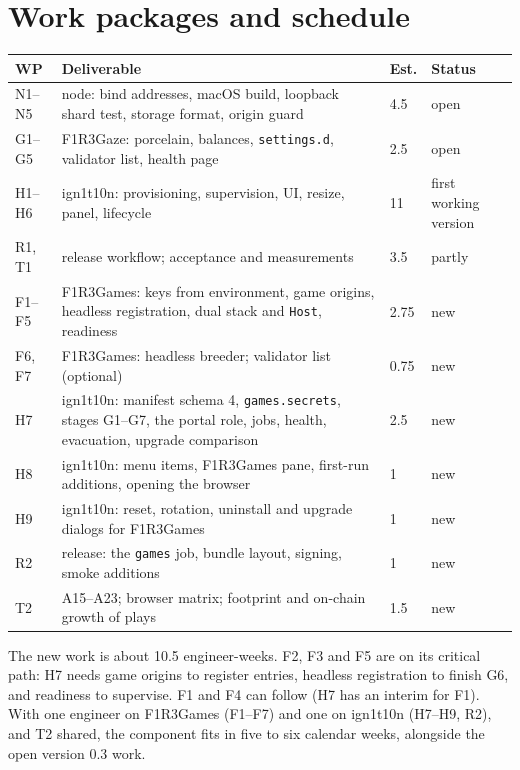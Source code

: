 \documentclass[11pt]{article}
\theoremstyle{definition}
\theoremstyle{remark}
\newcommand{\code}[1]{\texttt{#1}}
\newcommand{\Gz}{F1R3Gaze}
\newcommand{\Hr}{ign1t10n}
\newcommand{\Gm}{F1R3Games}
\begin{document}
\section{Work packages and schedule}\label{sec:plan}

\begin{center}\small
\renewcommand{\arraystretch}{1.15}
\begin{tabularx}{\linewidth}{@{}>{\raggedright\arraybackslash}p{1.3cm}X p{0.9cm}>{\raggedright\arraybackslash}p{2.2cm}@{}}
\toprule
WP & Deliverable & Est. & Status\\
\midrule
N1--N5 & node: bind addresses, macOS build, loopback shard test, storage format, origin guard & 4.5 & open\\
G1--G5 & \Gz{}: porcelain, balances, \code{settings.d}, validator list, health page & 2.5 & open\\
H1--H6 & \Hr{}: provisioning, supervision, UI, resize, panel, lifecycle & 11 & first working version\\
R1, T1 & release workflow; acceptance and measurements & 3.5 & partly\\
\midrule
F1--F5 & \Gm{}: keys from environment, game origins, headless registration, dual stack and \code{Host}, readiness & 2.75 & new\\
F6, F7 & \Gm{}: headless breeder; validator list (optional) & 0.75 & new\\
H7 & \Hr{}: manifest schema 4, \code{games.secrets}, stages G1--G7, the portal role, jobs, health, evacuation, upgrade comparison & 2.5 & new\\
H8 & \Hr{}: menu items, \Gm{} pane, first-run additions, opening the browser & 1 & new\\
H9 & \Hr{}: reset, rotation, uninstall and upgrade dialogs for \Gm{} & 1 & new\\
R2 & release: the \code{games} job, bundle layout, signing, smoke additions & 1 & new\\
T2 & A15--A23; browser matrix; footprint and on-chain growth of plays & 1.5 & new\\
\bottomrule
\end{tabularx}
\end{center}

\noindent
The new work is about 10.5 engineer-weeks. F2, F3 and F5 are on its critical path:
H7 needs game origins to register entries, headless registration to finish G6, and
readiness to supervise. F1 and F4 can follow (H7 has an interim for F1). With one
engineer on \Gm{} (F1--F7) and one on \Hr{} (H7--H9, R2), and T2 shared, the
component fits in five to six calendar weeks, alongside the open version 0.3 work.
\end{document}
